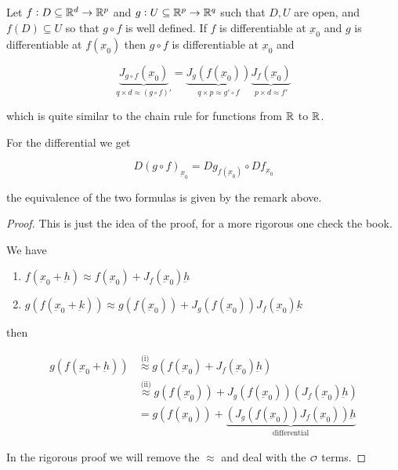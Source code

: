 \documentclass[12pt]{report}
\renewcommand{\vec}[1]{\underbar{\ensuremath{#1}}}
\begin{document}
\begin{theorem}
    Let $f: D \subseteq \mathbb{R}^d \to \mathbb{R}^p$ and $g: U \subseteq \mathbb{R}^p \to \mathbb{R}^q$ such that $D, U$ are open, and $f(D) \subseteq U$ so that $g \circ f$ is well defined.
    If $f$ is differentiable at $\vec{x}_0$ and $g$ is differentiable at $f(\vec{x}_0)$ then $g \circ f$ is differentiable at $\vec{x}_0$ and

    $$
        \underbrace{J_{g \circ f}(\vec{x}_0)}_{q \times d \approx (g \circ f)'} =
        \underbrace{J_g(f(\vec{x}_0))}_{q \times p \approx g' \circ f}
        \underbrace{J_f(\vec{x}_0)}_{p \times d \approx f'}
    $$

    which is quite similar to the chain rule for functions from $\mathbb{R}$ to $\mathbb{R}$.

    For the differential we get

    $$
        D(g \circ f)_{\vec{x}_0} = Dg_{f(\vec{x}_0)} \circ Df_{\vec{x}_0}
    $$

    the equivalence of the two formulas is given by the remark above.
\end{theorem}

\begin{proof}
    This is just the idea of the proof, for a more rigorous one check the book.

    We have
    \begin{enumerate}[label=(\roman*)]
        \item $f(\vec{x}_0 + \vec{h}) \approx f(\vec{x}_0) + J_f(\vec{x}_0) \vec{h}$
        \item $g(f(\vec{x}_0 + \vec{k})) \approx g(f(\vec{x}_0)) + J_g(f(\vec{x}_0)) J_f(\vec{x}_0) \vec{k}$
    \end{enumerate}

    then

    \begin{align*}
        g(f(\vec{x}_0 + \vec{h})) & \stackrel{\text{(i)}}{\approx} g(f(\vec{x}_0) + J_f(\vec{x}_0) \vec{h})                           \\
                                  & \stackrel{\text{(ii)}}{\approx} g(f(\vec{x}_0)) + J_g(f(\vec{x}_0)) (J_f(\vec{x}_0) \vec{h})      \\
                                  & = g(f(\vec{x}_0)) + \underbrace{(J_g(f(\vec{x}_0)) J_f(\vec{x}_0)) \vec{h}}_{\text{differential}}
    \end{align*}

    In the rigorous proof we will remove the $\approx$ and deal with the $\o$ terms.
\end{proof}
\end{document}

